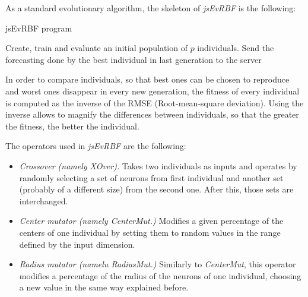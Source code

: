 \documentclass{article}
\begin{document}
As a standard evolutionary algorithm, the skeleton of {\em jsEvRBF} is the following:

\begin{algorithm}
\caption{jsEvRBF program}
\begin{algorithmic}
\STATE Create, train and evaluate an initial population of $p$ individuals.
\ENDFOR
\STATE Send the forecasting done by the best individual in last generation to the server
\end{algorithmic}
\end{algorithm}




In order to compare individuals, so that best ones can be chosen to reproduce and worst ones disappear in every new generation, the fitness of every individual is computed as the inverse of the RMSE (Root-mean-square deviation). Using the inverse allows to magnify the differences between individuals, so that the greater the fitness, the better the individual.

The operators used in {\em jsEvRBF} are the following:

\begin{itemize}
\item {\em Crossover (namely XOver).} Takes two individuals as inputs and operates by randomly selecting a set of neurons from first individual and another set (probably of a different size) from the second one. After this, those sets are interchanged.
\item {\em Center mutator (namely CenterMut.)} Modifies a given percentage of the centers of one individual by setting them to random values in the range defined by the input dimension.
\item {\em Radius mutator (namelu RadiusMut.)} Similarly to \emph{CenterMut}, this operator modifies a percentage of the radius of the neurons of one individual, choosing a new value in the same way explained before.
\end{itemize}
\end{document}
